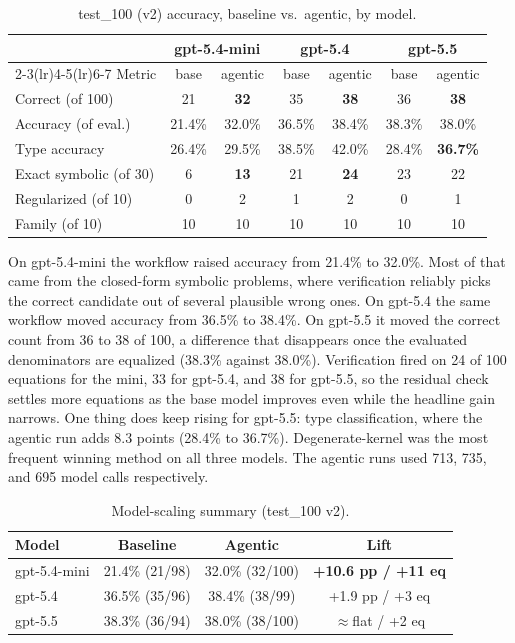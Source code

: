 \documentclass[11pt]{article}
\begin{document}
\begin{table}[h]
\centering
\caption{test\_100 (v2) accuracy, baseline vs.\ agentic, by model.}
\small
\begin{tabular}{lcccccc}
\toprule
 & \multicolumn{2}{c}{gpt-5.4-mini} & \multicolumn{2}{c}{gpt-5.4} & \multicolumn{2}{c}{gpt-5.5} \\
\cmidrule(lr){2-3}\cmidrule(lr){4-5}\cmidrule(lr){6-7}
Metric & base & agentic & base & agentic & base & agentic \\
\midrule
Correct (of 100)        & 21 & \textbf{32} & 35 & \textbf{38} & 36 & \textbf{38} \\
Accuracy (of eval.)     & 21.4\% & 32.0\% & 36.5\% & 38.4\% & 38.3\% & 38.0\% \\
Type accuracy           & 26.4\% & 29.5\% & 38.5\% & 42.0\% & 28.4\% & \textbf{36.7\%} \\
Exact symbolic (of 30)  & 6 & \textbf{13} & 21 & \textbf{24} & 23 & 22 \\
Regularized (of 10)     & 0 & 2 & 1 & 2 & 0 & 1 \\
Family (of 10)          & 10 & 10 & 10 & 10 & 10 & 10 \\
\bottomrule
\end{tabular}
\end{table}

On gpt-5.4-mini the workflow raised accuracy from 21.4\% to 32.0\%. Most of that
came from the closed-form symbolic problems, where verification reliably picks
the correct candidate out of several plausible wrong ones. On gpt-5.4 the same
workflow moved accuracy from 36.5\% to 38.4\%. On gpt-5.5 it moved the correct
count from 36 to 38 of 100, a difference that disappears once the evaluated
denominators are equalized (38.3\% against 38.0\%). Verification fired on 24 of
100 equations for the mini, 33 for gpt-5.4, and 38 for gpt-5.5, so the residual
check settles more equations as the base model improves even while the headline
gain narrows. One thing does keep rising for gpt-5.5: type classification, where
the agentic run adds 8.3 points (28.4\% to 36.7\%). Degenerate-kernel was the
most frequent winning method on all three models. The agentic runs used 713,
735, and 695 model calls respectively.

\begin{table}[h]
\centering
\caption{Model-scaling summary (test\_100 v2).}
\begin{tabular}{lccc}
\toprule
Model & Baseline & Agentic & Lift \\
\midrule
gpt-5.4-mini & 21.4\% (21/98) & 32.0\% (32/100) & \textbf{+10.6 pp / +11 eq} \\
gpt-5.4      & 36.5\% (35/96) & 38.4\% (38/99)  & +1.9 pp / +3 eq \\
gpt-5.5      & 38.3\% (36/94) & 38.0\% (38/100) & $\approx$flat / +2 eq \\
\bottomrule
\end{tabular}
\end{table}
\end{document}
